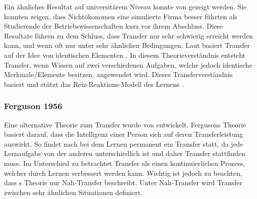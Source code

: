 Ein ähnliches Resultat auf universitärem Niveau konnte von \citet{Renkl1994} gezeigt werden. Sie konnten zeigen, dass Nichtökonomen eine simulierte Firma besser führten als Studierende der Betriebswissenschaften kurz vor ihrem Abschluss. Diese Resultate führen zu dem Schluss, dass Transfer nur sehr schwierig erreicht werden kann, und wenn oft nur unter sehr ähnlichen Bedingungen. Laut \citet{Woodworth1901} basiert Transfer auf der Idee von identischen Elementen \citep{Pea2013b}. In diesem Theorieverständnis entsteht Transfer, wenn Wissen auf zwei verschiedenen Aufgaben, welche jedoch identische Merkmale/Elemente besitzen, angewendet wird. Dieses Transferverständnis basiert und stützt das Reiz-Reaktions-Modell des Lernens \citep{Detterman1993, Mietzel2007}.


\subsubsection{Ferguson 1956}
Eine alternative Theorie zum Transfer wurde von \citet{Ferguson1956} entwickelt. Fergusons Theorie basiert darauf, dass die Intelligenz einer Person sich auf deren Transferleistung auswirkt. So findet nach \citet{Ferguson1956} bei dem Lernen permanent ein Transfer statt, da jede Lernaufgabe von der anderen unterschiedlich ist und daher Transfer stattfinden muss. Im Unterschied zu \citet{Woodworth1901} betrachtet \citeauthor{Ferguson1956} Transfer als einen kontinuierlichen Prozess, welcher durch Lernen verbessert werden kann. Wichtig ist jedoch zu beachten, dass \citeauthor{Ferguson1956}s Theorie nur Nah-Transfer beschreibt. Unter Nah-Transfer wird Transfer zwischen sehr ähnlichen Situationen definiert. 


